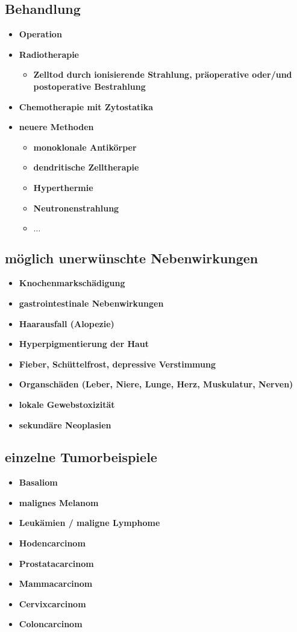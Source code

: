 	\subsection{Behandlung}
		\begin{itemize}
			\item \textbf{Operation}
			\item \textbf{Radiotherapie}
				\begin{itemize}
					\item \textbf{Zelltod durch ionisierende Strahlung, präoperative oder/und postoperative Bestrahlung}
				\end{itemize}
			\item \textbf{Chemotherapie mit Zytostatika}
			\item \textbf{neuere Methoden}
				\begin{itemize}
					\item \textbf{monoklonale Antikörper}
					\item \textbf{dendritische Zelltherapie}
					\item \textbf{Hyperthermie}
					\item \textbf{Neutronenstrahlung}
					\item \textbf{$\dots$}
				\end{itemize}
		\end{itemize}
	\subsection{möglich unerwünschte Nebenwirkungen}
		\begin{itemize}
			\item \textbf{Knochenmarkschädigung}
			\item \textbf{gastrointestinale Nebenwirkungen}
			\item \textbf{Haarausfall (Alopezie)}
			\item \textbf{Hyperpigmentierung der Haut}
			\item \textbf{Fieber, Schüttelfrost, depressive Verstimmung}
			\item \textbf{Organschäden (Leber, Niere, Lunge, Herz, Muskulatur, Nerven)}
			\item \textbf{lokale Gewebstoxizität}
			\item \textbf{sekundäre Neoplasien}
		\end{itemize}
	\subsection{einzelne Tumorbeispiele}
		\begin{itemize}
			\item \textbf{Basaliom}
			\item \textbf{malignes Melanom}
			\item \textbf{Leukämien / maligne Lymphome}
			\item \textbf{Hodencarcinom}
			\item \textbf{Prostatacarcinom}
			\item \textbf{Mammacarcinom}
			\item \textbf{Cervixcarcinom}
			\item \textbf{Coloncarcinom}
		\end{itemize}